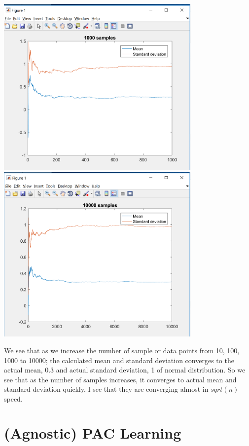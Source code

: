 \documentclass{article}
\begin{document}
\begin{itemize}
\includegraphics[width=100mm,scale=0.3]{5_3}\\
\includegraphics[width=100mm,scale=0.3]{5_4}\\
\begin{mdframed}[backgroundcolor=lightgray]
We see that as we increase the number of sample or data points from 10, 100, 1000 to 10000; the calculated mean and standard deviation converges to the actual mean, 0.3 and actual standard deviation, 1 of normal distribution. So we see that as the number of samples increases, it converges to actual mean and standard deviation quickly. I see that they are converging almost in $sqrt(n)$ speed.
\end{mdframed}
\end{itemize}

\section{(Agnostic) PAC Learning}
\end{document}
